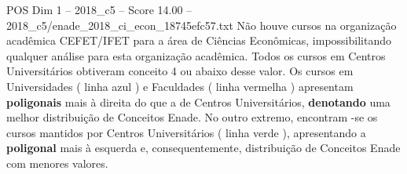 \begin{textsample}{POS Dim 1 – 2018\_c5 – Score 14.00 – 2018\_c5/enade\_2018\_ci\_econ\_18745efc57.txt}
Não houve cursos na organização acadêmica CEFET/IFET para a área de Ciências Econômicas, impossibilitando qualquer análise para esta organização acadêmica.
Todos os cursos em Centros Universitários obtiveram conceito 4 ou abaixo desse valor.
Os cursos em Universidades ( linha azul ) e Faculdades ( linha vermelha ) apresentam \textbf{poligonais} mais à direita do que a de Centros Universitários, \textbf{denotando} uma melhor distribuição de Conceitos Enade.
No outro extremo, encontram -se os cursos mantidos por Centros Universitários ( linha verde ), apresentando a \textbf{poligonal} mais à esquerda e, consequentemente, distribuição de Conceitos Enade com menores valores.

\end{textsample}
